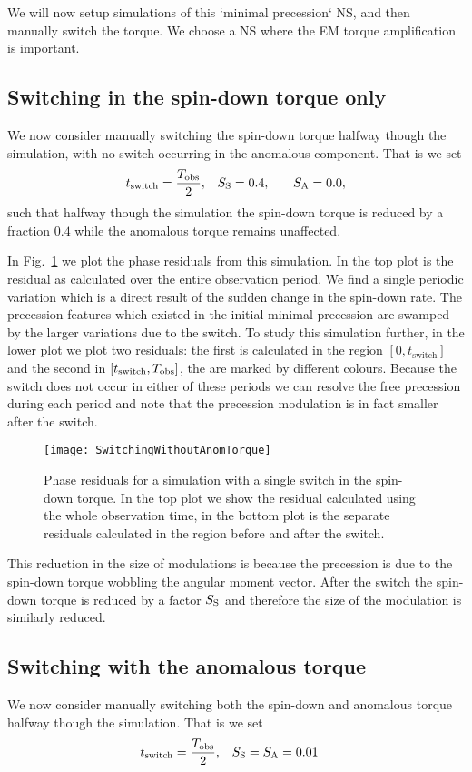 \documentclass[../full_thesis/full_thesis.tex]{subfiles}
\begin{document}
We will now setup simulations of this `minimal precession` NS, and then
manually switch the torque. We choose a NS where the EM torque amplification
is important.

\subsection{Switching in the spin-down torque only}
We now consider manually switching the spin-down torque halfway though the
simulation, with no switch occurring in the anomalous component.
That is we set
\begin{align}
    t_{\mathrm{switch}} = \frac{T_{\textrm{obs}}}{2}, &&& S_{\mathrm{S}} = 0.4, &&& S_{\mathrm{A}} = 0.0,
\end{align}
such that halfway though the simulation the spin-down torque is reduced by a
fraction $0.4$ while the anomalous torque remains unaffected.

In Fig.~\ref{fig: switching without anom} we plot the phase residuals from
this simulation. In the top plot is the residual as calculated over the entire
observation period. We find a single periodic variation which is a direct result
of the sudden change in the spin-down rate. The precession features which existed
in the initial minimal precession are swamped by the larger variations due to
the switch. To study this simulation further,
in the lower plot we plot two residuals: the first is calculated
in the region $[0, t_{\mathrm{switch}}]$ and the second in $[t_{\mathrm{switch}}, T_{\textrm{obs}}]$,
the are marked by different colours.
Because the switch does not occur in either of these periods we can resolve the
free precession during each period and note that the precession modulation is
in fact smaller after the switch.
\begin{figure}[htb]
\texttt{[image: SwitchingWithoutAnomTorque]}
\caption{Phase residuals for a simulation with a single switch in the spin-down
torque. In the top plot we show the residual calculated using the whole observation
time, in the bottom plot is the separate residuals calculated in the region before
and after the switch.}
\label{fig: switching without anom}
\end{figure}
This reduction in the size of modulations is because the precession is due to
the spin-down torque wobbling the angular moment vector. After the switch the
spin-down torque is reduced by a factor $S_{\mathrm{S}}$ and therefore the size of the
modulation is similarly reduced.

\subsection{Switching with the anomalous torque}
We now consider manually switching both the spin-down and anomalous torque
halfway though the simulation.  That is we set
\begin{align}
    t_{\mathrm{switch}} = \frac{T_{\textrm{obs}}}{2}, &&& S_{\mathrm{S}} = S_{\mathrm{A}} = 0.01
\end{align}
\end{document}
